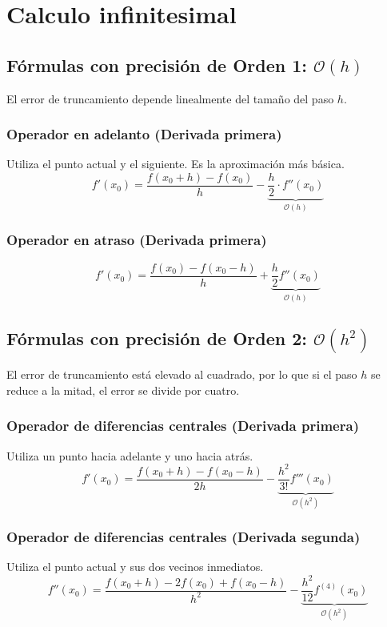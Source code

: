 \section{Calculo infinitesimal}
\subsection{Fórmulas con precisión de Orden 1: $\mathcal{O}(h)$}
El error de truncamiento depende linealmente del tamaño del paso $h$. 

\subsubsection{Operador en adelanto (Derivada primera)}
Utiliza el punto actual y el siguiente. Es la aproximación más básica.
\begin{equation}
    f'(x_0) = \frac{f(x_0+h) - f(x_0)}{h} - \underbrace{\frac{h}{2} \cdot f''(x_0)}_{\mathcal{O}(h)}
\end{equation}
\subsubsection{Operador en atraso (Derivada primera)}

$$f'(x_0) = \frac{f(x_0) - f(x_0-h)}{h} + \underbrace{\frac{h}{2} f''(x_0)}_{\mathcal{O}(h)}$$

\subsection{Fórmulas con precisión de Orden 2: $\mathcal{O}(h^2)$}
El error de truncamiento está elevado al cuadrado, por lo que si el paso $h$ se reduce a la mitad, el error se divide por cuatro.

\subsubsection{Operador de diferencias centrales (Derivada primera)}
Utiliza un punto hacia adelante y uno hacia atrás.
\begin{equation}
    f'(x_0) = \frac{f(x_0+h) - f(x_0-h)}{2h} - \underbrace{\frac{h^2}{3!} f'''(x_0)}_{\mathcal{O}(h^2)}
\end{equation}

\subsubsection{Operador de diferencias centrales (Derivada segunda)}
Utiliza el punto actual y sus dos vecinos inmediatos.
\begin{equation}
    f''(x_0) = \frac{f(x_0+h) - 2f(x_0) + f(x_0-h)}{h^2} - \underbrace{\frac{h^2}{12} f^{(4)}(x_0)}_{\mathcal{O}(h^2)}
\end{equation}


